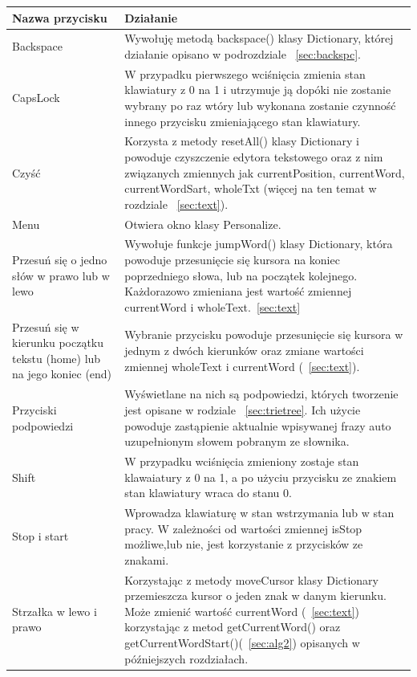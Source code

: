 \documentclass[twoside,a4paper]{book}
\begin{document}
\begin{table}
    \begin{tabular}{|p{4cm}|p{8.5cm}|}
        \hline
    \textbf{Nazwa przycisku} & \textbf{Działanie}\\ \hline
     Backspace & Wywołuję metodą backspace() klasy Dictionary, której działanie opisano w podrozdziale ~\ref{sec:backspc}.\\ \hline
    CapsLock & W przypadku pierwszego wciśnięcia zmienia stan klawiatury z 0 na 1 i utrzymuje ją dopóki nie zostanie wybrany po raz wtóry lub wykonana zostanie czynność innego przycisku zmieniającego stan klawiatury. \\ \hline
 Czyść & Korzysta z metody resetAll() klasy Dictionary i powoduje czyszczenie edytora tekstowego oraz z nim związanych zmiennych jak currentPosition, currentWord, currentWordSart, wholeTxt (więcej na ten temat w rozdziale ~\ref{sec:text}).\\ \hline
Menu & Otwiera okno klasy Personalize.\\ \hline
Przesuń się o jedno słów w prawo lub w lewo & Wywołuje funkcje jumpWord() klasy Dictionary, która powoduje przesunięcie się kursora na koniec poprzedniego słowa, lub na początek kolejnego. Każdorazowo zmieniana jest wartość zmiennej currentWord i wholeText.~\ref{sec:text}\\ \hline
 Przesuń się w kierunku początku tekstu (home) lub na jego koniec (end) & Wybranie przycisku powoduje przesunięcie się kursora w jednym z dwóch kierunków oraz zmiane wartości zmiennej wholeText i currentWord (~\ref{sec:text}). \\ \hline
 Przyciski podpowiedzi & Wyświetlane na nich są podpowiedzi, których tworzenie jest opisane w rodziale ~\ref{sec:trietree}. Ich użycie powoduje zastąpienie aktualnie wpisywanej frazy auto uzupełnionym słowem pobranym ze słownika. \\ \hline
  Shift & W przypadku wciśnięcia zmieniony zostaje stan klawaiatury z 0 na 1, a po użyciu przycisku ze znakiem stan klawiatury wraca do stanu 0. \\ \hline
   Stop i start & Wprowadza klawiaturę w stan wstrzymania lub w stan pracy. W zależności od wartości zmiennej isStop możliwe,lub nie, jest korzystanie z przycisków ze znakami.\\ \hline
   Strzałka w lewo i prawo &  Korzystając z metody moveCursor klasy Dictionary przemieszcza kursor o jeden znak w danym kierunku. Może zmienić wartość currentWord (~\ref{sec:text}) korzystając z metod getCurrentWord() oraz getCurrentWordStart()(~\ref{sec:alg2}) opisanych w późniejszych rozdziałach.\\ \hline

\end{tabular}
\end{table}
\end{document}

